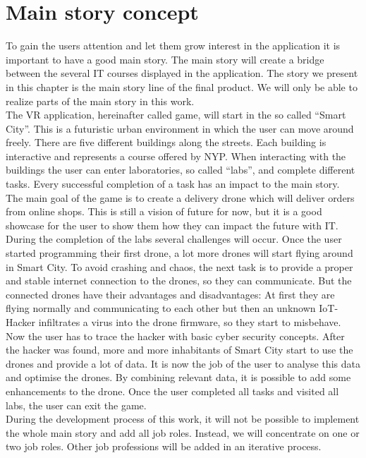 \section{Main story concept}
To gain the users attention and let them grow interest in the application it is important to have a good main story. The main story will create a bridge between the several IT courses displayed in the application. The story we present in this chapter is the main story line of the final product. We will only be able to realize parts of the main story in this work.\\
The VR application, hereinafter called game, will start in the so called ``Smart City''. This is a futuristic urban environment in which the user can move around freely. There are five different buildings along the streets. Each building is interactive and represents a course offered by NYP. When interacting with the buildings the user can enter laboratories, so called ``labs'', and complete different tasks. Every successful completion of a task has an impact to the main story. \\
The main goal of the game is to create a delivery drone which will deliver orders from online shops. This is still a vision of future for now, but it is a good showcase for the user to show them how they can impact the future with IT. During the completion of the labs several challenges will occur. Once the user started programming their first drone, a lot more drones will start flying around in Smart City. To avoid crashing and chaos, the next task is to provide a proper and stable internet connection to the drones, so they can communicate. But the connected drones have their advantages and disadvantages: At first they are flying normally and communicating to each other but then an unknown IoT-Hacker infiltrates a virus into the drone firmware, so they start to misbehave. Now the user has to trace the hacker with basic cyber security concepts. After the hacker was found, more and more inhabitants of Smart City start to use the drones and provide a lot of data. It is now the job of the user to analyse this data and optimise the drones. By combining relevant data, it is possible to add some enhancements to the drone.
Once the user completed all tasks and visited all labs, the user can exit the game. \\
During the development process of this work, it will not be possible to implement the whole main story and add all job roles. Instead, we will concentrate on one or two job roles. Other job professions will be added in an iterative process.
\newpage
